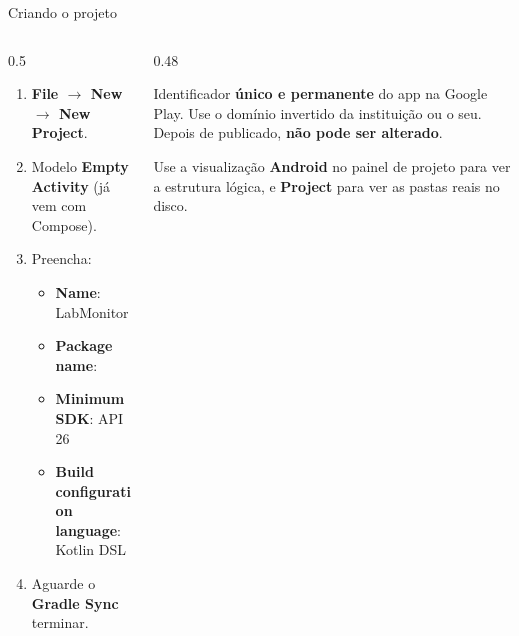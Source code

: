 \documentclass[aspectratio=169,10pt]{beamer}
\begin{document}
\begin{frame}{Criando o projeto}
  \begin{columns}[T]
    \begin{column}{0.5\textwidth}
      \begin{enumerate}
        \item \textbf{File $\rightarrow$ New $\rightarrow$ New Project}.
        \item Modelo \textbf{Empty Activity} (já vem com Compose).
        \item Preencha:
          \begin{itemize}
            \item \textbf{Name}: LabMonitor
            \item \textbf{Package name}: 
            \item \textbf{Minimum SDK}: API 26
            \item \textbf{Build configuration language}: Kotlin DSL
          \end{itemize}
        \item Aguarde o \textbf{Gradle Sync} terminar.
      \end{enumerate}
    \end{column}
    \begin{column}{0.48\textwidth}
      \begin{conceito}
        Identificador \textbf{único e permanente} do app na Google Play. Use o domínio invertido da instituição ou o seu. Depois de publicado, \textbf{não pode ser alterado}.
      \end{conceito}
      \begin{dica}
        Use a visualização \textbf{Android} no painel de projeto para ver a estrutura lógica, e \textbf{Project} para ver as pastas reais no disco.
      \end{dica}
    \end{column}
  \end{columns}
\end{frame}
\end{document}
